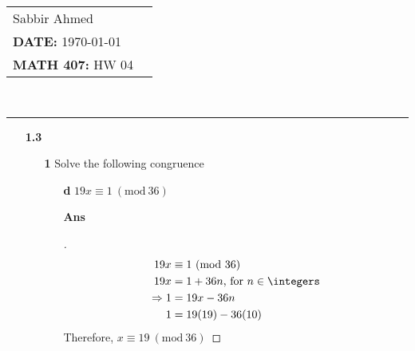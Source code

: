 \documentclass[paper=usletter, fontsize=12pt]{article}
\newcommand{\documentinfo}[5]{
    \begin{centering}
        \parbox{2in}{
        \begin{spacing}{1}
            \begin{flushleft}
                \begin{tabular}{l l}
                    #1 \\
                    #2 \\
                    #3 \\
                \end{tabular}\\
                \rule{\textwidth}{1pt}
            \end{flushleft}
        \end{spacing}
        }
    \end{centering}
}
\newcommand{\Mod}[1]{\ (\mathrm{mod}\ #1)}
\begin{document}
    \documentinfo{Sabbir Ahmed}{\textbf{DATE:} \today}{\textbf{MATH 407:} HW 04}
    \vspace{-0.2in}

    \begin{itemize}

        \item[\textbf{1.3}]

        \begin{itemize}

            \item[\textbf{1}] Solve the following congruence

            \begin{itemize}

                \item[\textbf{d}] $19x \equiv 1 \Mod{36}$
                \item[\textbf{Ans}]
                \begin{proof}[\unskip\nopunct]
                    \begin{align*}
                        19x & \equiv 1 \Mod{36} \\
                        19x & = 1 + 36n \text{, for } n \in \integers\\
                        \Rightarrow 1 & = 19x - 36n\\
                        1 & = 19(19) - 36(10)
                    \end{align*}
                    Therefore, $x \equiv 19 \Mod{36}$
                \end{proof}
                \vspace{0.2in}

            \end{itemize}


\end{itemize}
\end{itemize}
\end{document}
